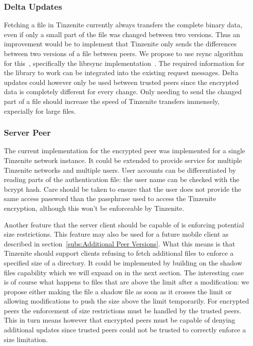 \subsubsection{Delta Updates}
\label{subs:Delta Updates}

Fetching a file in Tinzenite currently always transfers the complete binary data, even if only a small part of the file was changed between two versions.
Thus an improvement would be to implement that Tinzenite only sends the differences between two versions of a file between peers.
We propose to use rsync algorithm for this~\cite{tridgell1996rsync}, specifically the librsync implementation~\cite{web:site:librsync}.
The required information for the library to work can be integrated into the existing request messages.
Delta updates could however only be used between trusted peers since the encrypted data is completely different for every change.
Only needing to send the changed part of a file should increase the speed of Tinzenite transfers immensely, expecially for large files.

\subsubsection{Server Peer}
\label{subs:Server Peer}

The current implementation for the encrypted peer was implemented for a single Tinzenite network instance.
It could be extended to provide service for multiple Tinzenite networks and multiple users.
User accounts can be differentiated by reading parts of the authentication file: the user name can be checked with the bcrypt hash.
Care should be taken to ensure that the user does not provide the same access password than the passphrase used to access the Tinzenite encryption, although this won't be enforceable by Tinzenite.

Another feature that the server client should be capable of is enforcing potential size restrictions.
This feature may also be used for a future mobile client as described in section~\ref{subs:Additional Peer Versions}.
What this means is that Tinzenite should support clients refusing to fetch additional files to enforce a specified size of a directory.
It could be implemented by building on the shadow files capability which we will expand on in the next section.
The interesting case is of course what happens to files that are above the limit after a modification: we propose either making the file a shadow file as soon as it crosses the limit or allowing modifications to push the size above the limit temporarily.
For encrypted peers the enforcement of size restrictions must be handled by the trusted peers.
This in turn means however that encrypted peers must be capable of denying additional updates since trusted peers could not be trusted to correctly enforce a size limitation.

